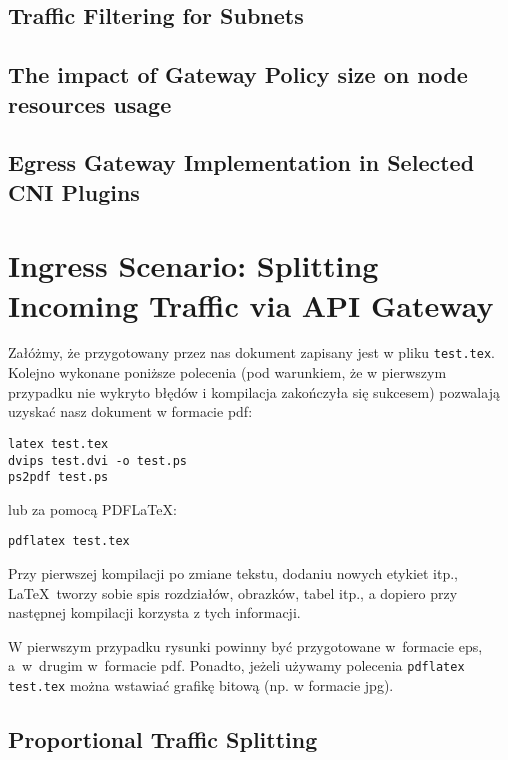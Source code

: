 
\subsection{Traffic Filtering for Subnets}
\label{subsection:filtering}

\subsection{The impact of Gateway Policy size on node resources usage}
\label{subsection:impact}

\subsection{Egress Gateway Implementation in Selected CNI Plugins}
\label{subsection:gateway}


\section{Ingress Scenario: Splitting Incoming Traffic via API Gateway}
\label{sec:ingress}


Załóżmy, że przygotowany przez nas dokument zapisany jest w pliku \texttt{test.tex}. Kolejno wykonane poniższe polecenia (pod warunkiem, że w pierwszym przypadku nie wykryto błędów i kompilacja zakończyła się sukcesem) pozwalają uzyskać nasz dokument w formacie pdf:
\begin{lstlisting}
latex test.tex
dvips test.dvi -o test.ps
ps2pdf test.ps
\end{lstlisting}
%
lub za pomocą PDF\LaTeX:
\begin{lstlisting}
pdflatex test.tex
\end{lstlisting}

Przy pierwszej kompilacji po zmiane tekstu, dodaniu nowych etykiet itp., \LaTeX~tworzy sobie spis rozdziałów, obrazków, tabel itp., a dopiero przy następnej kompilacji korzysta z tych informacji.

W pierwszym przypadku rysunki powinny być przygotowane w~formacie eps, a~w~drugim w~formacie pdf. Ponadto, jeżeli używamy polecenia \texttt{pdflatex test.tex} można wstawiać grafikę bitową (np. w formacie jpg).




\subsection{Proportional Traffic Splitting}
\label{subsection:proportional_splitting}

